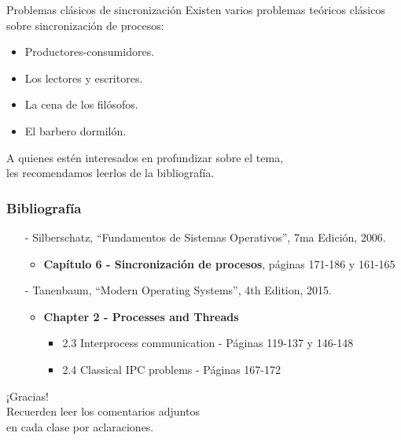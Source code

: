 \documentclass[aspectratio=169]{beamer}
\begin{document}
\begin{frame}{Problemas clásicos de sincronización}
    Existen varios problemas teóricos clásicos sobre sincronización de procesos:\\
    \bigskip
    \begin{itemize} 
        \item Productores-consumidores.
        \item Los lectores y escritores.
        \item La cena de los filósofos.
        \item El barbero dormilón.
    \end{itemize}
    \bigskip
    A quienes estén interesados en profundizar sobre el tema,\\ les recomendamos leerlos de la bibliografía.
\end{frame}

\begin{frame}[fragile]
    \frametitle{Bibliografía}
    \begin{itemize}
        \setlength\itemsep{0.5cm}
        \item[-] \small Silberschatz, ``Fundamentos de Sistemas Operativos'', 7ma Edición, 2006.\\
        \begin{itemize}
            \item \textbf{Capítulo 6 - Sincronización de procesos}, páginas 171-186 y 161-165
        \end{itemize}
        \item[-] \small Tanenbaum, ``Modern Operating Systems'', 4th Edition, 2015.\\
        \begin{itemize}
            \item \textbf{Chapter 2 - Processes and Threads}
            \begin{itemize}
                \item 2.3 Interprocess communication - Páginas 119-137 y 146-148
                \item 2.4 Classical IPC problems - Páginas 167-172
            \end{itemize}
        \end{itemize}
    \end{itemize}
\end{frame}

\begin{frame}[plain]
    \begin{center}
    \vspace{2cm}
    \huge ¡Gracias!\\
    \vspace{2cm}
    \normalsize Recuerden leer los comentarios adjuntos\\ en cada clase por aclaraciones.
    \end{center}
\end{frame}
\end{document}
